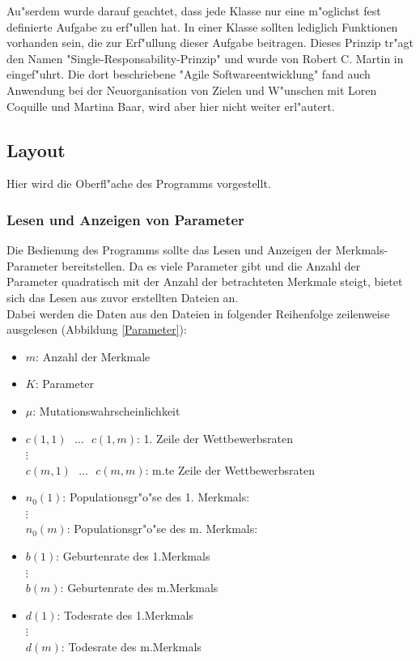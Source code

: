 \documentclass[11pt, a4paper, german]{article}
\theoremstyle{plain}
\begin{document}
	Au"serdem wurde darauf geachtet, dass jede Klasse nur eine m"oglichst fest definierte Aufgabe zu erf"ullen hat. In einer Klasse sollten lediglich Funktionen vorhanden sein, die zur Erf"ullung dieser Aufgabe beitragen. Dieses Prinzip tr"agt den Namen "{}Single-Responsability-Prinzip"{} und wurde von Robert C. Martin in \cite{Martin:2003:ASD:515230} eingef"uhrt. Die dort beschriebene "{}Agile Softwareentwicklung"{} fand auch Anwendung bei der Neuorganisation von Zielen und W"unschen mit Loren Coquille und Martina Baar, wird aber hier nicht weiter erl"autert.
	
	\subsection{Layout}
	Hier wird die Oberfl"ache des Programms vorgestellt.
	\subsubsection{Lesen und Anzeigen von Parameter}
	Die Bedienung des Programms sollte das Lesen und Anzeigen der Merkmals-Parameter bereitstellen. Da es viele Parameter gibt und die Anzahl der Parameter quadratisch mit der Anzahl der betrachteten Merkmale steigt, bietet sich das Lesen aus zuvor erstellten Dateien an.\\
	Dabei werden die Daten aus den Dateien in folgender Reihenfolge zeilenweise ausgelesen (Abbildung \ref{Parameter}):
	\begin{itemize}
		\item $ m $: Anzahl der Merkmale
		\item $ K $: Parameter
		\item $ \mu $: Mutationswahrscheinlichkeit
		\item $ c(1,1) \text{ } \dots \text{ } c(1,m) $: 1. Zeile der Wettbewerbsraten \\
			$ \vdots $\\
			$ c(m,1) \text{ } \dots \text{ } c(m,m) $: m.te Zeile der Wettbewerbsraten 
		\item $ n_0(1) $: Populationsgr"o"se des 1. Merkmals: \\
			$ \vdots $\\
			$ n_0(m) $: Populationsgr"o"se des m. Merkmals: 
		\item $ b(1) $: Geburtenrate des 1.Merkmals\\
			$ \vdots $\\
			$ b(m) $: Geburtenrate des m.Merkmals
		\item $ d(1) $: Todesrate des 1.Merkmals\\
			$ \vdots $\\
			$ d(m) $: Todesrate des m.Merkmals
	\end{itemize}
	
\end{document}
